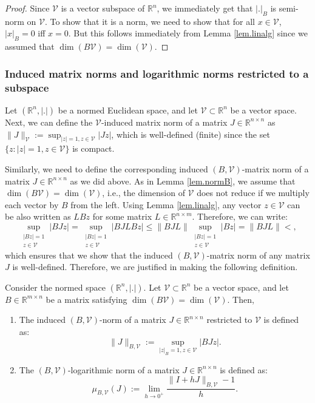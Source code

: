 \documentclass[onefignum,onetabnum]{siamonline220329}
\newcommand{\cV}{{\mathcal{V}}}
\def\infty{}%
\begin{document}
{\begin{proof}
Since $\cV$ is a vector subspace of $\mathbb R^n$, we immediately get that $|.|_B$ is semi-norm on  $\cV$. To show that it is a norm, we need to show that for all $x\in\cV$, $|x|_B=0$ iff $x=0$.  But this follows immediately from Lemma \ref{lem.linalg} 
 since we assumed that {${\dim}(B\cV)={\dim}(\cV)$}.  
\end{proof}

 \subsubsection{Induced matrix norms and logarithmic norms restricted to a subspace}

Let $(\mathbb R^n, |.|)$ be  a normed Euclidean space, and let $\cV \subset \mathbb R^n$ be a vector space.   
Next, we can define the $\cV$-induced matrix norm of a matrix $J \in\mathbb R^{n\times n}$ as $\|J\|_{\cV}:=\sup_{|z|=1, z\in\cV} |Jz|$, which is well-defined (finite) since the set $\{z: |z|=1, z\in\cV\}$ is compact. 
 
Similarly, we need to define the corresponding induced $(B,\cV)$-matrix norm of a matrix $J \in \mathbb R^{n\times n}$ as we did above.  %
As in Lemma \ref{lem.normB}, we assume that  ${\dim}(B\cV)={\dim}(\cV)$, i.e., the dimension of $\cV$ does not reduce if we multiply each vector by $B$ from the left. Using Lemma \ref{lem.linalg},  any vector $z\in\cV$ can be also written as $LBz$ for some matrix $L\in\mathbb R^{{n\times m}}$. Therefore, we can write:
\[ 
\sup_{\substack{|Bz|=1\\ z\in\cV }} |BJz|= \sup_{\substack{|Bz|=1\\ z\in\cV }} |BJLBz| \le \|BJL\| \sup_{\substack{|Bz|=1\\ z\in\cV }} |Bz|= \|BJL\| <\infty, 
\]
which ensures that we show that the induced $(B,\cV)$-matrix norm of any matrix $J$ is well-defined.
Therefore, we are justified in making the following definition.

\begin{definition} 
Consider the normed  space $(\mathbb R^n, |.|)$. Let $\cV \subset \mathbb R^n$ be a vector space, and let $B\in\mathbb R^{m\times n}$ be a matrix satisfying ${\dim}(B\cV)={\dim}(\cV)$. Then,
\begin{enumerate}
\item The induced $(B,\cV)$-norm of a matrix $J\in\mathbb R^{n\times n}$ restricted to $\cV$ is defined as:
\[
\|J\|_{B,\cV}:= \sup_{|z|_B=1,z\in\cV} |BJz|. 
\]
\item The $(B,\cV)$-logarithmic norm of a matrix $J\in\mathbb R^{n\times n}$ is defined as:
\[
\mu_{B,\cV}(J):= \lim_{h\to0^+} \frac{ \|I+hJ\|_{B,\cV} -1 } h. 
\] 
\end{enumerate} 
\end{definition}

}
\end{document}
